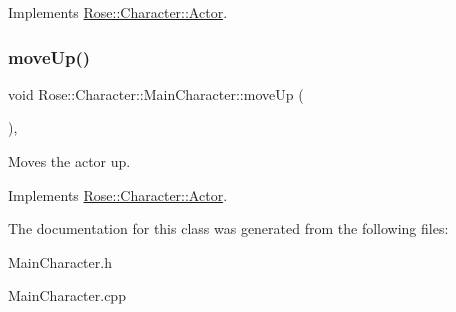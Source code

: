 Implements \mbox{\hyperlink{classRose_1_1Character_1_1Actor_a89ce0e5d1d6d25b1612867b982221dc9}{Rose\+::\+Character\+::\+Actor}}.

\mbox{\label{classRose_1_1Character_1_1MainCharacter_a9f967f5ad98eaae08948ab65bfd1a90b}} 
\subsubsection{\texorpdfstring{moveUp()}{moveUp()}}
{\footnotesize\ttfamily void Rose\+::\+Character\+::\+Main\+Character\+::move\+Up (\begin{DoxyParamCaption}{ }\end{DoxyParamCaption})\hspace{0.3cm}{\ttfamily [override]}, {\ttfamily [virtual]}}



Moves the actor up. 



Implements \mbox{\hyperlink{classRose_1_1Character_1_1Actor_afd7130be2654a3fa94122cf532de4b79}{Rose\+::\+Character\+::\+Actor}}.



The documentation for this class was generated from the following files\+:\begin{DoxyCompactItemize}
\item 
Main\+Character.\+h\item 
Main\+Character.\+cpp\end{DoxyCompactItemize}
